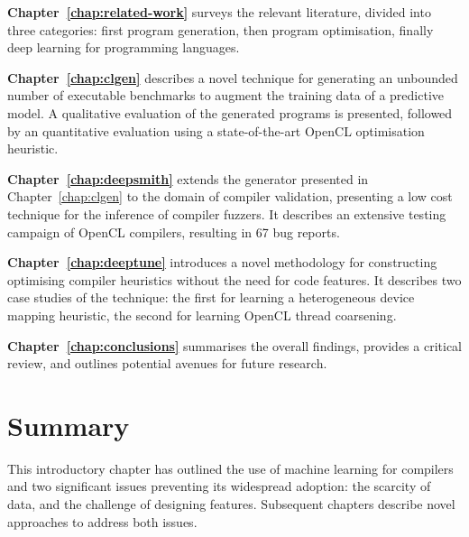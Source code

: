 \textbf{Chapter~\ref{chap:related-work}} surveys the relevant literature, divided into three categories: first program generation, then program optimisation, finally deep learning for programming languages.

\textbf{Chapter~\ref{chap:clgen}} describes a novel technique for generating an unbounded number of executable benchmarks to augment the training data of a predictive model. A qualitative evaluation of the generated programs is presented, followed by an quantitative evaluation using a state-of-the-art OpenCL optimisation heuristic.

\textbf{Chapter~\ref{chap:deepsmith}} extends the generator presented in Chapter~\ref{chap:clgen} to the domain of compiler validation, presenting a low cost technique for the inference of compiler fuzzers. It describes an extensive testing campaign of OpenCL compilers, resulting in 67 bug reports.

\textbf{Chapter~\ref{chap:deeptune}} introduces a novel methodology for constructing optimising compiler heuristics without the need for code features. It describes two case studies of the technique: the first for learning a heterogeneous device mapping heuristic, the second for learning OpenCL thread coarsening.

\textbf{Chapter~\ref{chap:conclusions}} summarises the overall findings, provides a critical review, and outlines potential avenues for future research.


\section{Summary}

This introductory chapter has outlined the use of machine learning for compilers and two significant issues preventing its widespread adoption: the scarcity of data, and the challenge of designing features. Subsequent chapters describe novel approaches to address both issues.
